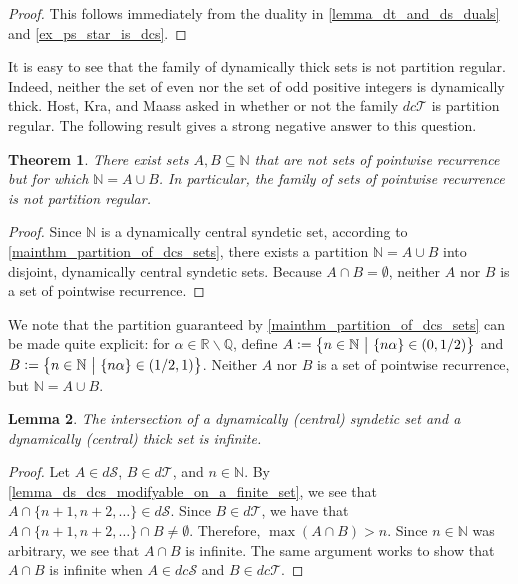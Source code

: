\documentclass[letter,11pt]{article}
\theoremstyle{plain}
\newtheorem{theorem}{Theorem}
\newtheorem{lemma}[theorem]{Lemma}
\theoremstyle{definition}
\theoremstyle{plain}
\theoremstyle{plain}
\numberwithin{equation}{section}
\newcommand{\N}{\mathbb{N}}
\newcommand{\R}{\mathbb{R}}
\newcommand{\Q}{\mathbb{Q}}
\newcommand{\defeq}{\vcentcolon=}
\renewcommand{\setminus}{\backslash}
\newcommand{\dsyndetic}{d\mathcal{S}}
\newcommand{\dthick}{d\mathcal{T}}
\newcommand{\dcsyndetic}{dc\mathcal{S}}
\newcommand{\dcthick}{dc\mathcal{T}}
\begin{document}
\begin{proof}
    This follows immediately from the duality in \cref{lemma_dt_and_ds_duals} and \cref{ex_ps_star_is_dcs}.
\end{proof}


It is easy to see that the family of dynamically thick sets is not partition regular.  Indeed, neither the set of even nor the set of odd positive integers is dynamically thick. Host, Kra, and Maass asked in \cite[Question 6.5]{HostKraMaass2016} whether or not the family $\dcthick$ is partition regular.  The following result gives a strong negative answer to this question.


\begin{theorem}
\label{thm_partition_of_N_into_disjoint_non_sets_of_rec}
    There exist sets $A, B \subseteq \N$ that are not sets of pointwise recurrence but for which $\N = A \cup B$.  In particular, the family of sets of pointwise recurrence is not partition regular.
\end{theorem}

\begin{proof}
    Since $\N$ is a dynamically central syndetic set, according to \cref{mainthm_partition_of_dcs_sets}, there exists a partition $\N = A \cup B$ into disjoint, dynamically central syndetic sets. Because $A \cap B = \emptyset$, neither $A$ nor $B$ is a set of pointwise recurrence.
\end{proof}

We note that the partition guaranteed by \cref{mainthm_partition_of_dcs_sets} can be made quite explicit: for $\alpha \in \R \setminus \Q$, define $A \defeq \big\{n \in \N \ \big| \ \{n \alpha\} \in (0,1/2)\big\}$ and $B \defeq \big\{n \in \N \ \big| \ \{n \alpha\} \in (1/2,1)\big\}$.  Neither $A$ nor $B$ is a set of pointwise recurrence, but $\N = A \cup B$.


\begin{lemma}
    \label{lemma_intersection_of_ds_and_dt_is_infinite}
    The intersection of a dynamically (central) syndetic set and a dynamically (central) thick set is infinite.
\end{lemma}

\begin{proof}
    Let $A \in \dsyndetic$, $B \in \dthick$, and $n \in \N$.  By \cref{lemma_ds_dcs_modifyable_on_a_finite_set}, we see that $A \cap \{n+1, n+2, \ldots\} \in \dsyndetic$.  Since $B \in \dthick$, we have that $A \cap \{n+1, n+2, \ldots\} \cap B \neq \emptyset$.  Therefore, $\max (A \cap B) > n$.  Since $n \in \N$ was arbitrary, we see that $A \cap B$ is infinite.  The same argument works to show that $A \cap B$ is infinite when $A \in \dcsyndetic$ and $B \in \dcthick$.
\end{proof}
\end{document}
